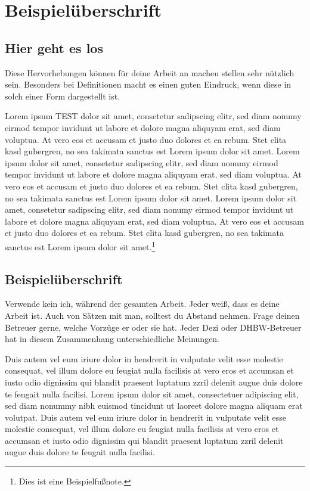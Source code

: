 	\chapter{Beispielüberschrift}
	
	\section{Hier geht es los}
	\begin{defStrich}[Definition]
		Diese Hervorhebungen können für deine Arbeit an machen stellen sehr nützlich sein. Besonders bei Definitionen macht es einen guten Eindruck, wenn diese in solch einer Form dargestellt ist. 
	\end{defStrich}
	Lorem ipsum \ac{TEST} dolor sit amet, consetetur sadipscing elitr, sed diam nonumy eirmod tempor invidunt ut labore et dolore magna aliquyam erat, sed diam voluptua. At vero eos et accusam et justo duo dolores et ea rebum. Stet clita kasd gubergren, no sea takimata sanctus est Lorem ipsum dolor sit amet. Lorem ipsum dolor sit amet, consetetur sadipscing elitr, sed diam nonumy eirmod tempor invidunt ut labore et dolore magna aliquyam erat, sed diam voluptua. At vero eos et accusam et justo duo dolores et ea rebum. Stet clita kasd gubergren, no sea takimata sanctus est Lorem ipsum dolor sit amet. Lorem ipsum dolor sit amet, consetetur sadipscing elitr, sed diam nonumy eirmod tempor invidunt ut labore et dolore magna aliquyam erat, sed diam voluptua. At vero eos et accusam et justo duo dolores et ea rebum. Stet clita kasd gubergren, no sea takimata sanctus est Lorem ipsum dolor sit amet.\footnote{Dies ist eine Beispielfußnote.}
	\section{Beispielüberschrift}
	\begin{defEckKasten}[Wichtig] Verwende kein \glqq ich\grqq{}, während der gesamten Arbeit. Jeder weiß, dass es deine Arbeit ist. Auch von Sätzen mit \glqq man\grqq{}, solltest du Abstand nehmen. Frage deinen Betreuer gerne, welche Vorzüge er oder sie hat. Jeder Dezi oder DHBW-Betreuer hat in diesem Zusammenhang unterschiedliche Meinungen.
	\end{defEckKasten}
	Duis autem vel eum iriure dolor in hendrerit in vulputate velit esse molestie consequat, vel illum dolore eu feugiat nulla facilisis at vero eros et accumsan et iusto odio dignissim qui blandit praesent luptatum zzril delenit augue duis dolore te feugait nulla facilisi. Lorem ipsum dolor sit amet, consectetuer adipiscing elit, sed diam nonummy nibh euismod tincidunt ut laoreet dolore magna aliquam erat volutpat. Duis autem vel eum iriure dolor in hendrerit in vulputate velit esse molestie consequat, vel illum dolore eu feugiat nulla facilisis at vero eros et accumsan et iusto odio dignissim qui blandit praesent luptatum zzril delenit augue duis dolore te feugait nulla facilisi. 
	
